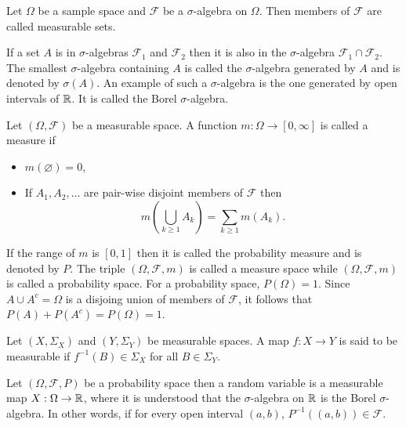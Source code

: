 \documentclass{article}
\begin{document}
\begin{defn}\label{c2d1}
Let $\Omega$ be a sample space and $\mathcal{F}$ be a $\sigma$-algebra on 
$\Omega$.  Then members of $\mathcal{F}$ are called measurable sets.
\end{defn}

If a set $A$ is in $\sigma$-algebras $\mathcal{F}_1$ and $\mathcal{F}_2$ then it
is also in the $\sigma$-algebra $\mathcal{F}_1 \cap \mathcal{F}_2$. The smallest
$\sigma$-algebra containing $A$ is called the $\sigma$-algebra generated by $A$
and is denoted by $\sigma(A)$. An example of such a $\sigma$-algebra is the one
generated by open intervals of $\mathbb{R}$. It is called the Borel $\sigma$-algebra.

\begin{defn}\label{c2d2}
Let $(\Omega, \mathcal{F})$ be a measurable space. A function $m:\Omega
\rightarrow [0, \infty]$ is called a measure if
\begin{itemize}
\item $m(\varnothing) = 0$,
\item If $A_1, A_2, \ldots$ are pair-wise disjoint members of $\mathcal{F}$ then
\[
m\left(\bigcup_{k \ge 1}A_k\right) = \sum_{k \ge 1}m(A_k).
\]
\end{itemize}
\end{defn}
If the range of $m$ is $[0, 1]$ then it is called the probability measure and is
denoted by $P$. The triple $(\Omega, \mathcal{F}, m)$ is called a measure space
while $(\Omega, \mathcal{F}, m)$ is called a probability space. For a probability
space, $P(\Omega) = 1$. Since  $A \cup A^c = \Omega$ is a disjoing union of 
members of $\mathcal{F}$, it follows that $P(A) + P(A^c) = P(\Omega) = 1$.

\begin{defn}\label{c2d3}
Let $(X, \Sigma_X)$ and $(Y, \Sigma_Y)$ be measurable spaces. A map $f: X 
\rightarrow Y$ is said to be measurable if $f^{-1}(B) \in \Sigma_X$ for all
$B \in \Sigma_Y$.
\end{defn}

\begin{defn}\label{c2d4}
Let $(\Omega, \mathcal{F}, P)$ be a probability space then a random variable
is a measurable map $X: \Omega \rightarrow \mathbb{R}$, where it is understood that
the $\sigma$-algebra on $\mathbb{R}$ is the Borel $\sigma$-algebra. In other words,
if for every open interval $(a, b)$, $P^{-1}((a, b)) \in \mathcal{F}$.
\end{defn}
\end{document}
